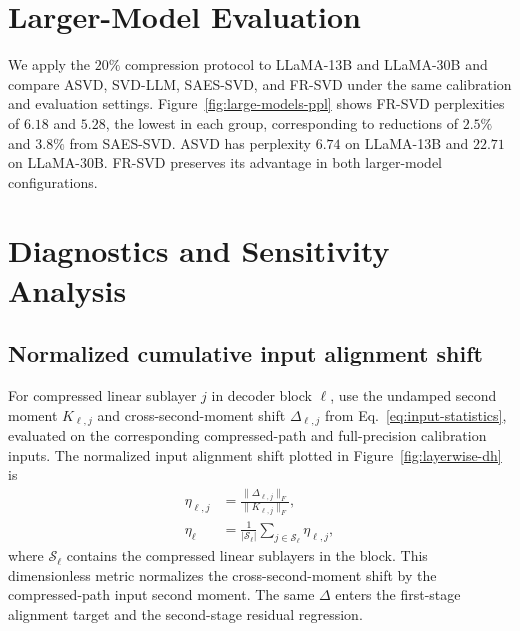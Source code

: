 \section{Larger-Model Evaluation}\label{app:full-results}\label{app:large-models}

We apply the $20\%$ compression protocol to LLaMA-13B and LLaMA-30B and compare ASVD, SVD-LLM, SAES-SVD, and FR-SVD under the same calibration and evaluation settings. Figure~\ref{fig:large-models-ppl} shows FR-SVD perplexities of $6.18$ and $5.28$, the lowest in each group, corresponding to reductions of $2.5\%$ and $3.8\%$ from SAES-SVD. ASVD has perplexity $6.74$ on LLaMA-13B and $22.71$ on LLaMA-30B. FR-SVD preserves its advantage in both larger-model configurations.



\section{Diagnostics and Sensitivity Analysis}\label{app:diagnostics}

\subsection{Normalized cumulative input alignment shift}\label{app:input-shift}
For compressed linear sublayer $j$ in decoder block $\ell$, use the undamped second moment $K_{\ell,j}$ and cross-second-moment shift $\Delta_{\ell,j}$ from Eq.~\eqref{eq:input-statistics}, evaluated on the corresponding compressed-path and full-precision calibration inputs. The normalized input alignment shift plotted in Figure~\ref{fig:layerwise-dh} is
\begin{equation}
\begin{aligned}
\eta_{\ell,j}&=\frac{\|\Delta_{\ell,j}\|_F}{\|K_{\ell,j}\|_F},\\
\eta_\ell&=\frac1{|\mathcal S_\ell|}\sum_{j\in\mathcal S_\ell}\eta_{\ell,j},
\end{aligned}
\label{eq:app-input-shift}
\end{equation}
where $\mathcal S_\ell$ contains the compressed linear sublayers in the block. This dimensionless metric normalizes the cross-second-moment shift by the compressed-path input second moment. The same $\Delta$ enters the first-stage alignment target and the second-stage residual regression.

